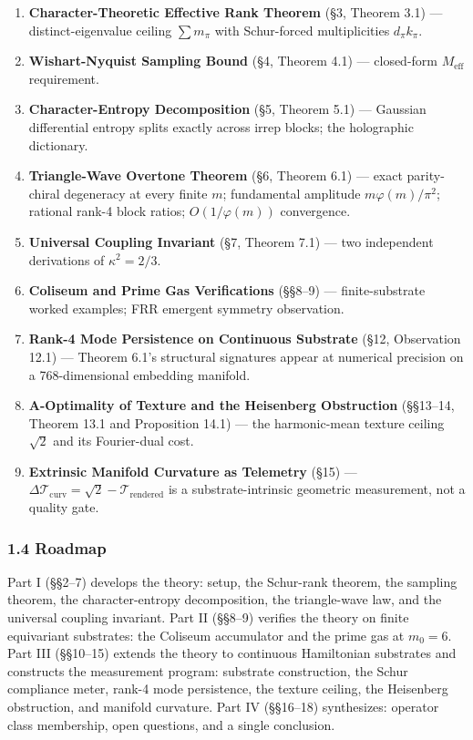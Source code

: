 \documentclass[
  11pt,
]{article}
\providecommand{\tightlist}{%
  \setlength{\itemsep}{0pt}\setlength{\parskip}{0pt}}
\begin{document}
\begin{enumerate}
\def\labelenumi{\arabic{enumi}.}
\tightlist
\item
  \textbf{Character-Theoretic Effective Rank Theorem} (§3, Theorem 3.1)
  --- distinct-eigenvalue ceiling \(\sum m_\pi\) with Schur-forced
  multiplicities \(d_\pi k_\pi\).
\item
  \textbf{Wishart-Nyquist Sampling Bound} (§4, Theorem 4.1) ---
  closed-form \(M_\text{eff}\) requirement.
\item
  \textbf{Character-Entropy Decomposition} (§5, Theorem 5.1) ---
  Gaussian differential entropy splits exactly across irrep blocks; the
  holographic dictionary.
\item
  \textbf{Triangle-Wave Overtone Theorem} (§6, Theorem 6.1) --- exact
  parity-chiral degeneracy at every finite \(m\); fundamental amplitude
  \(m\varphi(m)/\pi^2\); rational rank-4 block ratios;
  \(O(1/\varphi(m))\) convergence.
\item
  \textbf{Universal Coupling Invariant} (§7, Theorem 7.1) --- two
  independent derivations of \(\kappa^2 = 2/3\).
\item
  \textbf{Coliseum and Prime Gas Verifications} (§§8--9) ---
  finite-substrate worked examples; FRR emergent symmetry observation.
\item
  \textbf{Rank-4 Mode Persistence on Continuous Substrate} (§12,
  Observation 12.1) --- Theorem 6.1's structural signatures appear at
  numerical precision on a 768-dimensional embedding manifold.
\item
  \textbf{A-Optimality of Texture and the Heisenberg Obstruction}
  (§§13--14, Theorem 13.1 and Proposition 14.1) --- the harmonic-mean
  texture ceiling \(\sqrt{2}\) and its Fourier-dual cost.
\item
  \textbf{Extrinsic Manifold Curvature as Telemetry} (§15) ---
  \(\Delta\mathcal{T}_\text{curv} = \sqrt{2} - \mathcal{T}_\text{rendered}\)
  is a substrate-intrinsic geometric measurement, not a quality gate.
\end{enumerate}

\subsubsection{1.4 Roadmap}\label{roadmap}

Part I (§§2--7) develops the theory: setup, the Schur-rank theorem, the
sampling theorem, the character-entropy decomposition, the triangle-wave
law, and the universal coupling invariant. Part II (§§8--9) verifies the
theory on finite equivariant substrates: the Coliseum accumulator and
the prime gas at \(m_0 = 6\). Part III (§§10--15) extends the theory to
continuous Hamiltonian substrates and constructs the measurement
program: substrate construction, the Schur compliance meter, rank-4 mode
persistence, the texture ceiling, the Heisenberg obstruction, and
manifold curvature. Part IV (§§16--18) synthesizes: operator class
membership, open questions, and a single conclusion.
\end{document}
